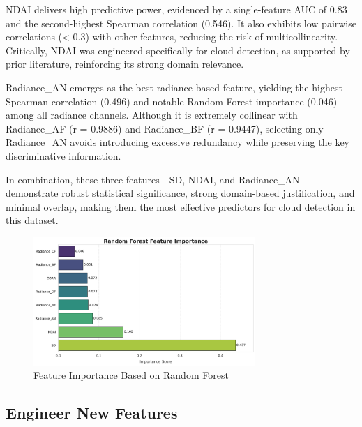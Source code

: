 \documentclass[11pt,letterpaper]{article}
\begin{document}
NDAI delivers high predictive power, evidenced by a single-feature AUC of 0.83 and the second-highest Spearman correlation (0.546). It also exhibits low pairwise correlations (< 0.3) with other features, reducing the risk of multicollinearity. Critically, NDAI was engineered specifically for cloud detection, as supported by prior literature, reinforcing its strong domain relevance.

Radiance\_AN emerges as the best radiance-based feature, yielding the highest Spearman correlation (0.496) and notable Random Forest importance (0.046) among all radiance channels. Although it is extremely collinear with Radiance\_AF (r = 0.9886) and Radiance\_BF (r = 0.9447), selecting only Radiance\_AN avoids introducing excessive redundancy while preserving the key discriminative information.

In combination, these three features—SD, NDAI, and Radiance\_AN—demonstrate robust statistical significance, strong domain-based justification, and minimal overlap, making them the most effective predictors for cloud detection in this dataset.
\begin{figure}[H]
    \centering
    \includegraphics[width=0.75\textwidth]{figs/fe2.pdf}
    \caption{Feature Importance Based on Random Forest}
    \label{fig:fe2}
\end{figure}\noindent

\vspace{1em} %
\subsection{Engineer New Features}
\vspace{0.5em} %


\end{document}
